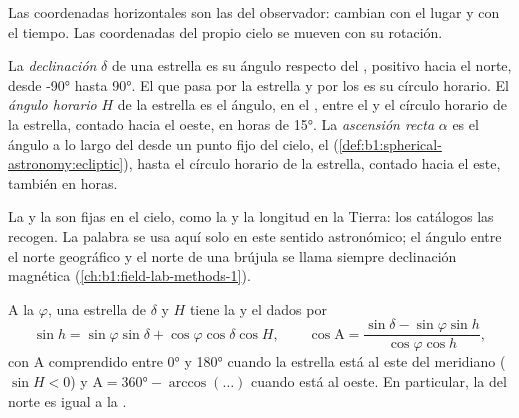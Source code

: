 Las coordenadas horizontales son las del observador: cambian con el lugar y con
el tiempo. Las coordenadas del propio cielo se mueven con su rotación.

\begin{definition}\label{def:b1:spherical-astronomy:equatorial}
La \emph{declinación} $\delta$ de una estrella es su
ángulo respecto del , positivo hacia el norte, desde \ang{-90}
hasta \ang{90}. El  que pasa por la estrella y por los  es su círculo horario. El \emph{ángulo horario} $H$
de la estrella es el ángulo, en el , entre el  y el
círculo horario de la estrella, contado hacia el oeste, en horas de \ang{15}. La
\emph{ascensión recta} $\alpha$ es el ángulo a lo largo del
 desde un punto fijo del cielo, el 
(\cref{def:b1:spherical-astronomy:ecliptic}), hasta el círculo horario de la
estrella, contado hacia el este, también en horas.
\end{definition}

La  y la  son fijas en el cielo, como la  y la
longitud en la Tierra: los catálogos las recogen. La palabra  se usa
aquí solo en este sentido astronómico; el ángulo entre el norte geográfico y el
norte de una brújula se llama siempre declinación magnética
(\cref{ch:b1:field-lab-methods-1}).

\begin{proposition}\label{prop:b1:spherical-astronomy:transform}
A la  $\varphi$, una estrella de  $\delta$ y  $H$
tiene la  y el  dados por
\[
  \sin h = \sin\varphi\sin\delta + \cos\varphi\cos\delta\cos H,
  \qquad
  \cos\mathrm{A} = \frac{\sin\delta - \sin\varphi\sin h}{\cos\varphi\cos h},
\]
con $\mathrm{A}$ comprendido entre \ang{0} y \ang{180} cuando la estrella está al
este del meridiano ($\sin H < 0$) y $\mathrm{A} = \ang{360} - \arccos(\dots)$
cuando está al oeste. En particular, la  del  norte es igual a
la .
\end{proposition}

